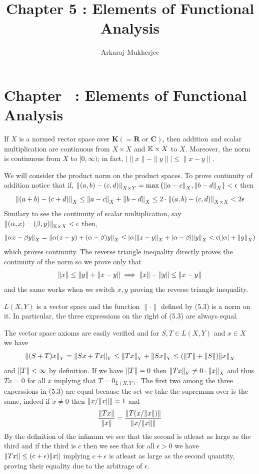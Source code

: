 \documentclass[12pt,a4paper]{article}
\title{\textbf{Chapter 5 : Elements of Functional Analysis}}
\author{Arkaraj Mukherjee}
\begin{document}
\maketitle
\newpage
\tableofcontents
\newpage
\setcounter{section}{5}
\section*{Chapter \thesection\ : Elements of Functional Analysis}
\begin{problem}\label{prob:5-1}
    If $X$ is a normed vector space over $\mathbf{K}(=\mathbf{R} \text{ or } \mathbf{C})$, then addition and scalar multiplication are continuous from $X \times X$ and $\mathbb{K} \times X$ to $X$. Moreover, the norm is continuous from $X$ to $[0,\infty)$; in fact, $\left| \|x\| - \|y\| \right| \le \|x-y\|$.
\end{problem}
\begin{solution}
We will consider the product norm on the product spaces. 
To prove continuity of addition notice that if, $\norm{(a,b)-(c,d)}_{X\times Y}=\max \qty{\norm{a-c}_X,\norm{b-d}_X}<\epsilon$ then 
\[
    \norm{(a+b)-(c+d)}_{X} \leq \norm{a-c}_X+\norm{b-d}_X \leq 2\cdot\norm{(a,b)-(c,d)}_{X\times X}<2\epsilon
\]
Similary to see the continuity of scalar multiplication, say $\norm{(\alpha,x)-(\beta,y)}_{\mathbb{K}\times X}<\epsilon$ then, 
\[
    \norm{\alpha x-\beta y}_{X}=\norm{\alpha(x-y)+(\alpha -\beta)y}_X\leq|\alpha|\norm{x-y}_X+|\alpha-\beta|\norm{y}_X<\epsilon(|\alpha|+\norm{y}_X)
\]
which proves continuity. 
The reverse triangle inequality directly proves the continuity of the norm so we prove only that
\[
    \norm{x}\leq\norm{y}+\norm{x-y}\implies\norm{x}-\norm{y}\leq\norm{x-y}
\]
and the same works when we switch $x,y$ proving the reverse triangle inequality. 
\end{solution}
\begin{problem}\label{prob:5-2}
$L(X,Y)$ is a vector space and the function $\|\cdot\|$ defined by (5.3) is a norm on it. In particular, the three expressions on the right of (5.3) are always equal.
\end{problem}
\begin{solution}
The vector space axioms are easily verified and for $S,T\in L(X,Y)$ and $x\in X$ we have 
\[
    \norm{(S+T)x}_Y=\norm{Sx+Tx}_Y\leq\norm{Tx}_Y+\norm{Sx}_Y\leq(\norm{T}+\norm{S})\norm{x}_X
\]
and $\norm{T}<\infty$ by definition. 
If we have $\norm{T}=0$ then $\norm{Tx}_Y\neq 0\cdot\norm{x}_X$ and thus $Tx=0$ for all $x$ implying that $T=0_{L(X,Y)}.$  
The first two among the three experssions in (5.3) are equal because the set we take the supremum over is the same, indeed if $x\neq 0$ then $\norm{x/\norm{x}}=1$ and 
\[
    \frac{\norm{Tx}}{\norm{x}}= \frac{\norm{T(x/\norm{x})}}{\norm{x/\norm{x}}}
\]
By the definition of the infimum we see that the second is atleast as large as the third and if the third is $c$ then we see that for all $\epsilon>0$ we have $\norm{Tx}\leq(c+\epsilon)\norm{x}$ implying $c+\epsilon$ is atleast as large as the second quantity, proving their equality due to the arbitrage of $\epsilon.$ 
\end{solution}
\end{document}
